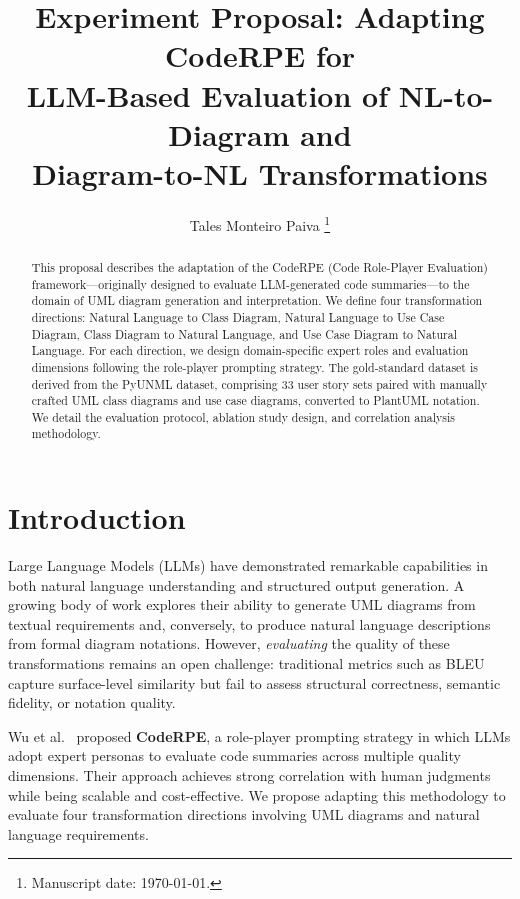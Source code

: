 \documentclass[lettersize,journal]{IEEEtran}
\begin{document}
\title{Experiment Proposal: Adapting CodeRPE for\\ LLM-Based Evaluation of NL-to-Diagram and\\ Diagram-to-NL Transformations}

\author{Tales Monteiro Paiva
\thanks{Manuscript date: \today.}}

\maketitle

\begin{abstract}
This proposal describes the adaptation of the CodeRPE (Code Role-Player Evaluation) framework---originally designed to evaluate LLM-generated code summaries---to the domain of UML diagram generation and interpretation. We define four transformation directions: Natural Language to Class Diagram, Natural Language to Use Case Diagram, Class Diagram to Natural Language, and Use Case Diagram to Natural Language. For each direction, we design domain-specific expert roles and evaluation dimensions following the role-player prompting strategy. The gold-standard dataset is derived from the PyUNML dataset, comprising 33 user story sets paired with manually crafted UML class diagrams and use case diagrams, converted to PlantUML notation. We detail the evaluation protocol, ablation study design, and correlation analysis methodology.
\end{abstract}

\section{Introduction}
\label{sec:introduction}

Large Language Models (LLMs) have demonstrated remarkable capabilities in both natural language understanding and structured output generation. A growing body of work explores their ability to generate UML diagrams from textual requirements and, conversely, to produce natural language descriptions from formal diagram notations. However, \emph{evaluating} the quality of these transformations remains an open challenge: traditional metrics such as BLEU capture surface-level similarity but fail to assess structural correctness, semantic fidelity, or notation quality.

Wu et al.~\cite{wu2025coderpe} proposed \textbf{CodeRPE}, a role-player prompting strategy in which LLMs adopt expert personas to evaluate code summaries across multiple quality dimensions. Their approach achieves strong correlation with human judgments while being scalable and cost-effective. We propose adapting this methodology to evaluate four transformation directions involving UML diagrams and natural language requirements.
\end{document}
